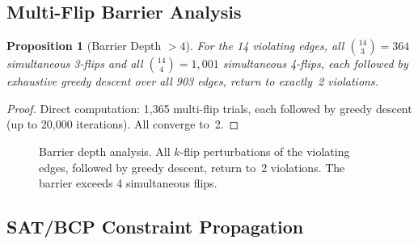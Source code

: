\documentclass[11pt,a4paper]{article}
\theoremstyle{plain}
\newtheorem{proposition}[theorem]{Proposition}
\theoremstyle{remark}
\begin{document}
\subsection{Multi-Flip Barrier Analysis}
\label{sec:multiflip}

\begin{proposition}[Barrier Depth $> 4$]\label{prop:barrier}
For the 14 violating edges, all $\binom{14}{3} = 364$ simultaneous
3-flips and all $\binom{14}{4} = 1{,}001$ simultaneous 4-flips,
each followed by exhaustive greedy descent over all 903 edges,
return to exactly~2 violations.
\end{proposition}

\begin{proof}
Direct computation: 1{,}365 multi-flip trials, each followed by
greedy descent (up to 20{,}000 iterations). All converge to~2.
\end{proof}

\begin{figure}[H]
\centering
{}
\caption{Barrier depth analysis. All $k$-flip perturbations of the
  violating edges, followed by greedy descent, return to~2 violations.
  The barrier exceeds 4 simultaneous flips.}
\label{fig:barrier}
\end{figure}

\subsection{SAT/BCP Constraint Propagation}
\label{sec:sat}
\end{document}
